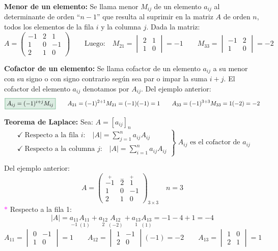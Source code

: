 \documentclass[11pt,a4paper]{article}
\newcommand{\hl}[1]{\textcolor{resaltado}{#1}}
\begin{document}
\textbf{Menor de un elemento:} Se llama menor $M_{ij}$ de un elemento $a_{ij}$ al
determinante de orden ``$n-1$'' que resulta al suprimir en la matriz $A$ de orden $n$, todos
los elementos de la fila $i$ y la columna $j$. Dada la matriz:
\[
A = \begin{pmatrix} -1 & 2 & 1\\ 1 & 0 & -1\\ 2 & 1 & 0\end{pmatrix}
\qquad\text{Luego:}\quad
M_{21} = \begin{vmatrix} 2 & 1\\ 1 & 0\end{vmatrix} = -1
\qquad
M_{33} = \begin{vmatrix} -1 & 2\\ 1 & 0\end{vmatrix} = -2
\]

\textbf{Cofactor de un elemento:} Se llama cofactor de un elemento \hl{$a_{ij}$} a su
\hl{menor} con su signo o con signo contrario según sea par o impar la suma $i + j$. El
cofactor del elemento \hl{$a_{ij}$} denotamos por \hl{$A_{ij}$}. Del ejemplo anterior:
\[
\fcolorbox{verde}{verde!15}{$A_{ij} = (-1)^{i+j}M_{ij}$}
\qquad
A_{21} = (-1)^{2+1}M_{21} = (-1)(-1) = 1
\qquad
A_{33} = (-1)^{3+3}M_{33} = 1(-2) = -2
\]

\textbf{Teorema de Laplace:} Sea: $A = [a_{ij}]_n$
\[
\left.
\begin{array}{l}
\checkmark\ \text{Respecto a la fila } i\text{:}\quad |A| = \displaystyle\sum_{j=1}^{n} a_{ij}A_{ij}\\[14pt]
\checkmark\ \text{Respecto a la columna } j\text{:}\quad |A| = \displaystyle\sum_{i=1}^{n} a_{ij}A_{ij}
\end{array}
\right\}\; A_{ij} \text{ es el cofactor de } a_{ij}
\]

Del ejemplo anterior:
\[
A = \begin{pmatrix}
\overset{+}{-1} & \overset{-}{2} & \overset{+}{1}\\
1 & 0 & -1\\
2 & 1 & 0
\end{pmatrix}_{3\times3}
\quad n = 3
\]
\textcolor{magenta}{$\ast$} Respecto a la fila 1:
\[
|A| = \underset{-1}{a_{11}}\underset{(1)}{A_{11}} + \underset{2}{a_{12}}\underset{(-2)}{A_{12}} + \underset{1}{a_{13}}\underset{(1)}{A_{13}} = -1 - 4 + 1 = \boxed{-4}
\]
\[
A_{11} = \begin{vmatrix} 0 & -1\\ 1 & 0\end{vmatrix} = 1
\qquad
A_{12} = \begin{vmatrix} 1 & -1\\ 2 & 0\end{vmatrix}(-1) = -2
\qquad
A_{13} = \begin{vmatrix} 1 & 0\\ 2 & 1\end{vmatrix} = 1
\]
\end{document}
